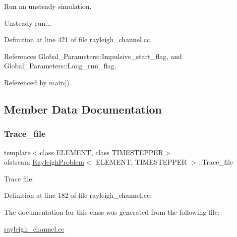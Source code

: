 Run an unsteady simulation. 

Unsteady run... 

Definition at line 421 of file rayleigh\+\_\+channel.\+cc.



References Global\+\_\+\+Parameters\+::\+Impulsive\+\_\+start\+\_\+flag, and Global\+\_\+\+Parameters\+::\+Long\+\_\+run\+\_\+flag.



Referenced by main().



\subsection{Member Data Documentation}
\mbox{\label{classRayleighProblem_a0fc091c88474779c0e3a474d5c8169f4}} 
\subsubsection{\texorpdfstring{Trace\+\_\+file}{Trace\_file}}
{\footnotesize\ttfamily template$<$class E\+L\+E\+M\+E\+NT, class T\+I\+M\+E\+S\+T\+E\+P\+P\+ER$>$ \\
ofstream \hyperlink{classRayleighProblem}{Rayleigh\+Problem}$<$ E\+L\+E\+M\+E\+NT, T\+I\+M\+E\+S\+T\+E\+P\+P\+ER $>$\+::Trace\+\_\+file\hspace{0.3cm}{\ttfamily [private]}}



Trace file. 



Definition at line 182 of file rayleigh\+\_\+channel.\+cc.



The documentation for this class was generated from the following file\+:\begin{DoxyCompactItemize}
\item 
\hyperlink{rayleigh__channel_8cc}{rayleigh\+\_\+channel.\+cc}\end{DoxyCompactItemize}
